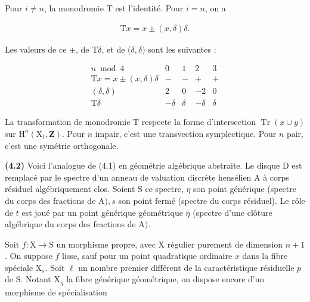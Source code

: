 \documentclass[10pt,leqno]{article}
\begin{document}
\noindent Pour \(i\ne n\), la monodromie \(\mathrm{T}\) est l’identité. Pour \(i=n\), on a\par

\begin{equation*}\begin{gathered}\mathrm{T}x = x \pm  (x,\delta )\delta .\end{gathered}\end{equation*}

\noindent Les valeurs de ce \(\pm \), de \(\mathrm{T}\delta \), et de (\(\delta ,\delta )\) sont les suivantes :\par

\[\begin{array}{crrrr}n\bmod4&0&1&2&3\\ \mathrm Tx=x\pm(x,\delta)\delta&-&-&+&+\\ (\delta,\delta)&2&0&-2&0\\ \mathrm T\delta&-\delta&\delta&-\delta&\delta\end{array}\]

\clearpage

\label{physical-17}\par\smallskip

\noindent La transformation de monodromie \(\mathrm{T}\) respecte la forme d’intersection \(\operatorname{Tr}(x\cup y)\) sur \(\mathrm{H}^{n}(\mathrm{X}_{t},\mathbf{Z})\). Pour \(n\) impair, c’est une transvection symplectique. Pour \(n\) pair, c’est une symétrie orthogonale.\par

\noindent \textbf{(4.2)} Voici l’analogue de (4.1) en géométrie algébrique abstraite. Le disque \(\mathrm{D}\) est remplacé par le spectre d’un anneau de valuation discrète hensélien \(\mathrm{A}\) à corps résiduel algébriquement clos. Soient \(\mathrm{S}\) ce spectre, \(\eta \) son point générique (spectre du corps des fractions de \(\mathrm{A}), s\) son point fermé (spectre du corps résiduel). Le rôle de \(t\) est joué par un point générique géométrique \(\overline{\eta }\) (spectre d’une clôture algébrique du corps des fractions de \(\mathrm{A})\).\par

\noindent Soit \(f : \mathrm{X}\longrightarrow \mathrm{S}\) un morphisme propre, avec \(\mathrm{X}\) régulier purement de dimension \(n+1\). On suppose \(f\) lisse, sauf pour un point quadratique ordinaire \(x\) dans la fibre spéciale \(\mathrm{X}_{s}\). Soit \(\ell \) un nombre premier différent de la caractéristique résiduelle \(p\) de \(\mathrm{S}\). Notant \(\mathrm{X}_{\overline{\eta }}\) la fibre générique géométrique, on dispose encore d’un morphisme de spécialisation\par
\end{document}
